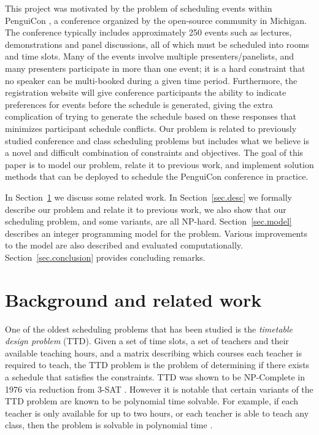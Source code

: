 \documentclass{svjour3}                     %
\begin{document}
This project was motivated by the problem of scheduling events within PenguiCon \cite{pc}, a conference organized by the open-source community in Michigan.  
The conference typically includes approximately 250 events such as lectures, demonstrations and panel discussions, all of which must be scheduled into rooms and time slots.
Many of the events involve multiple presenters/panelists, and many presenters participate in more than one event; it is a hard constraint that no speaker can be multi-booked during a given time period.
Furthermore, the registration website will give conference participants the ability to indicate preferences for events before the schedule is generated, giving the extra complication of trying to generate the schedule based on these responses that minimizes participant schedule conflicts.
Our problem is related to previously studied conference and class scheduling problems but includes what we believe is a novel and difficult combination of constraints and objectives.
The goal of this paper is to model our problem, relate it to previous work, and implement solution methods that can be deployed to schedule the PenguiCon conference in practice.

In Section~\ref{sec.back} we discuss some related work.
In Section~\ref{sec.desc} we formally describe our problem and relate it to previous work,
we also show that our scheduling problem, and some variants, are all NP-hard.
Section~\ref{sec.model} describes an integer programming model for the problem.
Various improvements to the model are also described and evaluated computationally.
Section~\ref{sec.conclusion} provides concluding remarks.

\section{Background and related work}\label{sec.back}

One of the oldest scheduling problems that has been studied is the \emph{timetable design problem} (TTD). 
Given a set of time slots, a set of teachers and their available teaching hours, and a matrix describing which courses each teacher is required to teach,  the TTD problem is the problem of determining if there exists a schedule that satisfies the constraints. 
TTD was shown to be NP-Complete in 1976 via reduction from 3-SAT \cite{even76}. 
However it is notable that certain variants of the TTD problem are known to be polynomial time solvable. 
For example, if each teacher is only available for up to two hours, or each teacher is able to teach any class, then the problem is solvable in polynomial time \cite{garey76}.
\end{document}
